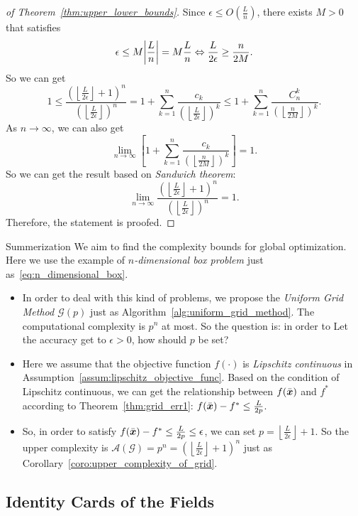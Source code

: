 \begin{proof}[of Theorem~\ref{thm:upper_lower_bounds}]
    Since \(\epsilon \le O\left( \frac{L}{n} \right)\), there exists \(M > 0\) that satisfies
    \[
        \epsilon \le M \abs{\frac{L}{n}} = M \frac{L}{n} \Leftrightarrow \frac{L}{2\epsilon} \ge \frac{n}{2M}.
    \]
    So we can get
    \[
        1 \le \frac{\left(\left\lfloor \frac{L}{2\epsilon} \right\rfloor + 1\right)^n}{\left(\left\lfloor \frac{L}{2\epsilon} \right\rfloor\right)^n} 
        = 1 + \sum_{k=1}^n\frac{c_k}{\left(\left\lfloor \frac{L}{2\epsilon} \right\rfloor\right)^k} 
        \le 1 + \sum_{k=1}^n\frac{C_n^k}{\left(\left\lfloor \frac{n}{2M} \right\rfloor\right)^k}.
    \]
    As \(n \to \infty\), we can also get
    \[
        \lim_{n\to\infty}\left[1 + \sum_{k=1}^n\frac{c_k}{\left(\left\lfloor \frac{n}{2M} \right\rfloor\right)^k}\right] = 1.
    \]
    So we can get the result based on \emph{Sandwich theorem}:
    \[
        \lim_{n \to \infty} \frac{\left(\left\lfloor \frac{L}{2\epsilon} \right\rfloor + 1\right)^n}{\left(\left\lfloor \frac{L}{2\epsilon} \right\rfloor\right)^n} = 1.
    \]
    Therefore, the statement is proofed.
\end{proof}


\begin{boxnote}{Summerization}
    We aim to find the complexity bounds for global optimization. Here we use the example of \emph{\(n\)-dimensional box problem} just as~\ref{eq:n_dimensional_box}. 
    \begin{itemize}
        \item In order to deal with this kind of problems, we propose the \emph{Uniform Grid Method \(\mathscr{G}(p)\)} just as Algorithm~\ref{alg:uniform_grid_method}. 
              The computational complexity is \(p^n\) at most. So the question is: in order to Let the accuracy get to \(\epsilon > 0\), how should \(p\) be set?
        \item Here we assume that the objective function \(f(\cdot)\) is \emph{Lipschitz continuous} in Assumption~\ref{assum:lipschitz_objective_func}. Based on the condition of Lipschitz continuous,
              we can get the relationship between \(f(\bar{\boldsymbol{x}})\) and \(f^*\) according to Theorem~\ref{thm:grid_err1}: \(f(\bar{\boldsymbol{x}}) - f^* \le \frac{L}{2p}\). 
        \item So, in order to satisfy \(f(\bar{\boldsymbol{x}}) - f^* \le \frac{L}{2p} \le \epsilon\), we can set \(p =\left\lfloor \frac{L}{2\epsilon} \right\rfloor + 1\). So the upper complexity is 
              \(\mathscr{A}(\mathscr{G}) = p^n = \left(\left\lfloor \frac{L}{2\epsilon} \right\rfloor + 1\right)^n\) just as Corollary~\ref{coro:upper_complexity_of_grid}.
    \end{itemize}
\end{boxnote}

\subsection{Identity Cards of the Fields}\label{subsec:Identity_Cards_of_the_Fields}